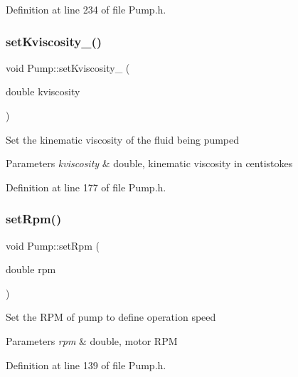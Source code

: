 Definition at line 234 of file Pump.\+h.

\mbox{\label{class_pump_a26d1d10908f91137f5148540ceb6520a}} 
\subsubsection{\texorpdfstring{set\+Kviscosity\+\_\+()}{setKviscosity\_()}}
{\footnotesize\ttfamily void Pump\+::set\+Kviscosity\+\_\+ (\begin{DoxyParamCaption}\item[{double}]{kviscosity }\end{DoxyParamCaption})\hspace{0.3cm}{\ttfamily [inline]}}

Set the kinematic viscosity of the fluid being pumped


\begin{DoxyParams}{Parameters}
{\em kviscosity} & double, kinematic viscosity in centistokes \\
\hline
\end{DoxyParams}


Definition at line 177 of file Pump.\+h.

\mbox{\label{class_pump_a7478d85c3b89cda275b039673603a785}} 
\subsubsection{\texorpdfstring{set\+Rpm()}{setRpm()}}
{\footnotesize\ttfamily void Pump\+::set\+Rpm (\begin{DoxyParamCaption}\item[{double}]{rpm }\end{DoxyParamCaption})\hspace{0.3cm}{\ttfamily [inline]}}

Set the R\+PM of pump to define operation speed


\begin{DoxyParams}{Parameters}
{\em rpm} & double, motor R\+PM \\
\hline
\end{DoxyParams}


Definition at line 139 of file Pump.\+h.

\mbox{\label{class_pump_a9b9773b74e0e56acece38107ab547728}} 
